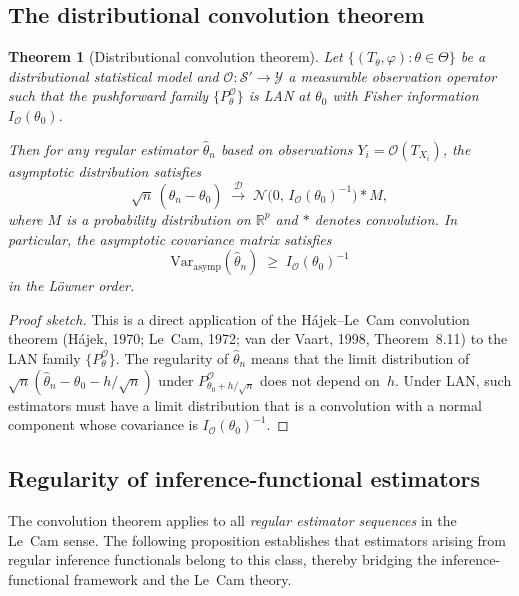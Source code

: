 \documentclass[11pt,a4paper]{article}
\newtheorem{theorem}{Theorem}[section]
\newcommand{\Var}{\mathrm{Var}}
\newcommand{\R}{\mathbb{R}}
\begin{document}
\subsection{The distributional convolution theorem}\label{subsec:convolution-thm}

\begin{theorem}[Distributional convolution theorem]\label{thm:convolution}
Let $\{(T_\theta, \varphi) : \theta \in \Theta\}$ be a distributional
statistical model and $\mathcal O : \mathcal S' \to \mathcal Y$ a
measurable observation operator such that the pushforward family
$\{P_\theta^{\mathcal O}\}$ is LAN at $\theta_0$ with Fisher information
$I_{\mathcal O}(\theta_0)$.

Then for any \emph{regular} estimator $\hat\theta_n$ based on observations
$Y_i = \mathcal O(T_{X_i})$, the asymptotic distribution satisfies
\begin{equation}\label{eq:convolution}
\sqrt{n}\,(\hat\theta_n - \theta_0)
\;\xrightarrow{\;\mathcal D\;}\;
\mathcal N\bigl(0,\, I_{\mathcal O}(\theta_0)^{-1}\bigr) * M,
\end{equation}
where $M$ is a probability distribution on $\R^p$ and $*$ denotes
convolution.  In particular, the asymptotic covariance matrix satisfies
\[
\Var_{\mathrm{asymp}}(\hat\theta_n)
\;\geq\;
I_{\mathcal O}(\theta_0)^{-1}
\]
in the L\"owner order.
\end{theorem}

\begin{proof}[Proof sketch]
This is a direct application of the H\'ajek--Le~Cam convolution theorem
(H\'ajek, 1970; Le~Cam, 1972; van der Vaart, 1998, Theorem~8.11) to the
LAN family $\{P_\theta^{\mathcal O}\}$.  The regularity of $\hat\theta_n$
means that the limit distribution of
$\sqrt{n}(\hat\theta_n - \theta_0 - h/\sqrt{n})$ under
$P_{\theta_0 + h/\sqrt{n}}^{\mathcal O}$ does not depend on~$h$.  Under
LAN, such estimators must have a limit distribution that is a convolution
with a normal component whose covariance is
$I_{\mathcal O}(\theta_0)^{-1}$.
\end{proof}

\subsection{Regularity of inference-functional estimators}\label{subsec:regularity-bridge}

The convolution theorem applies to all \emph{regular estimator sequences}
in the Le~Cam sense.  The following proposition establishes that estimators
arising from regular inference functionals belong to this class, thereby
bridging the inference-functional framework and the Le~Cam theory.
\end{document}
